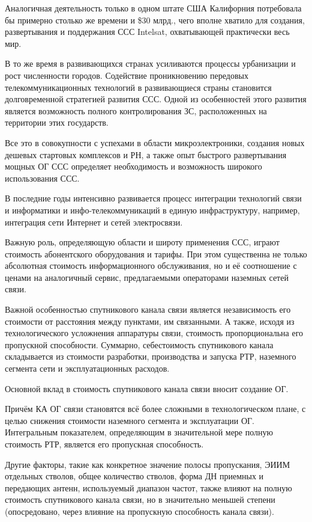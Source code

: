 \documentclass[14pt,a4paper,oneside]{extarticle}
\begin{document}
Аналогичная деятельность только в одном штате США Калифорния потребовала бы примерно столько же времени и \$30 млрд., чего вполне хватило для создания, развертывания и поддержания ССС Intelsat, охватывающей  практически весь мир.

В то же время в развивающихся странах усиливаются процессы урбанизации и рост численности городов. Содействие проникновению передовых телекоммуникационных технологий в развивающиеся страны становится долговременной стратегией развития ССС. Одной из особенностей этого развития является возможность полного контролирования ЗС, расположенных на территории этих государств.

Все это в совокупности с успехами в области микроэлектроники, создания новых дешевых стартовых комплексов и РН, а также опыт быстрого развертывания мощных ОГ ССС определяет  необходимость и возможность широкого использования ССС.

В последние годы интенсивно развивается процесс интеграции технологий связи и информатики и инфо-телекоммуникаций в единую  инфраструктуру, например, интеграция сети Интернет и сетей электросвязи.

Важную роль, определяющую области и широту применения ССС, играют стоимость абонентского оборудования и тарифы. При этом существенна не только абсолютная стоимость информационного обслуживания, но и её соотношение с  ценами на аналогичный сервис, предлагаемыми операторами наземных сетей связи.

Важной особенностью спутникового канала связи является независимость его стоимости от расстояния между пунктами, им связанными. А также, исходя из технологического усложнения аппаратуры связи, стоимость пропорциональна его  пропускной способности. Суммарно, себестоимость спутникового канала складывается из стоимости разработки, производства и запуска РТР, наземного сегмента сети и эксплуатационных расходов.

Основной вклад в стоимость спутникового канала связи вносит создание ОГ.

Причём КА ОГ связи становятся всё более сложными в технологическом плане, с целью снижения стоимости наземного сегмента и эксплуатации ОГ. Интегральным показателем, определяющим в значительной мере полную стоимость РТР, является его пропускная способность.

Другие факторы, такие как конкретное значение полосы  пропускания, ЭИИМ отдельных стволов, общее количество стволов, форма ДН приемных и передающих антенн, используемый диапазон частот, также влияют на полную стоимость спутникового канала связи, но в значительно меньшей степени (опосредовано, через влияние на пропускную способность канала связи).
\end{document}
